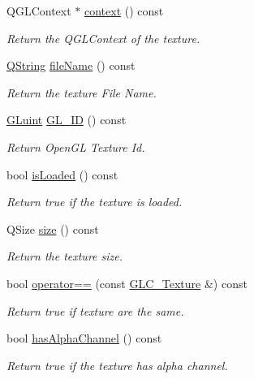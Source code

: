 \begin{DoxyCompactItemize}
\item 
Q\-G\-L\-Context $\ast$ \hyperlink{class_g_l_c___texture_a935e4e185b1b914542c9f7ffa18c6854}{context} () const 
\begin{DoxyCompactList}\small\item\em Return the Q\-G\-L\-Context of the texture. \end{DoxyCompactList}\item 
\hyperlink{group___u_a_v_objects_plugin_gab9d252f49c333c94a72f97ce3105a32d}{Q\-String} \hyperlink{class_g_l_c___texture_acc10491a7ab8a8072820657633d41dea}{file\-Name} () const 
\begin{DoxyCompactList}\small\item\em Return the texture File Name. \end{DoxyCompactList}\item 
\hyperlink{glext_8h_a2f0c8cd5c21f9fcbd931c3f48bc90dfc}{G\-Luint} \hyperlink{class_g_l_c___texture_aa9bc7312ee7b04afb7d51be631779ff1}{G\-L\-\_\-\-I\-D} () const 
\begin{DoxyCompactList}\small\item\em Return Open\-G\-L Texture Id. \end{DoxyCompactList}\item 
bool \hyperlink{class_g_l_c___texture_a8b5e4919ac8ead344b9696eb7bc05bb5}{is\-Loaded} () const 
\begin{DoxyCompactList}\small\item\em Return true if the texture is loaded. \end{DoxyCompactList}\item 
Q\-Size \hyperlink{class_g_l_c___texture_aa9454cf8057367715de164ee12de950c}{size} () const 
\begin{DoxyCompactList}\small\item\em Return the texture size. \end{DoxyCompactList}\item 
bool \hyperlink{class_g_l_c___texture_a8b74be7ccddb3c1fc64b66f2d458bda8}{operator==} (const \hyperlink{class_g_l_c___texture}{G\-L\-C\-\_\-\-Texture} \&) const 
\begin{DoxyCompactList}\small\item\em Return true if texture are the same. \end{DoxyCompactList}\item 
bool \hyperlink{class_g_l_c___texture_af040d82570c44cbf505214089c4fbbc2}{has\-Alpha\-Channel} () const 
\begin{DoxyCompactList}\small\item\em Return true if the texture has alpha channel. \end{DoxyCompactList}\item 

\end{DoxyCompactItemize}
